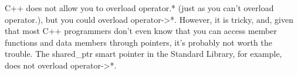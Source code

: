 C++ does not allow you to overload operator.* (just as you can’t overload operator.), but you could overload operator->*. However, it is tricky, and, given that most C++ programmers don’t even know that you can access member functions and data members through pointers, it’s probably not worth the trouble. The shared\_ptr smart pointer in the Standard Library, for example, does not overload operator->*.





















